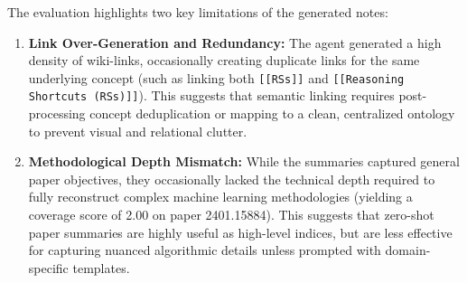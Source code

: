 \documentclass[runningheads]{llncs}
\begin{document}
The evaluation highlights two key limitations of the generated notes:
\begin{enumerate}
    \item \textbf{Link Over-Generation and Redundancy:} The agent generated a high density of wiki-links, occasionally creating duplicate links for the same underlying concept (such as linking both \texttt{[[RSs]]} and \texttt{[[Reasoning Shortcuts (RSs)]]}). This suggests that semantic linking requires post-processing concept deduplication or mapping to a clean, centralized ontology to prevent visual and relational clutter.
    \item \textbf{Methodological Depth Mismatch:} While the summaries captured general paper objectives, they occasionally lacked the technical depth required to fully reconstruct complex machine learning methodologies (yielding a coverage score of 2.00 on paper 2401.15884). This suggests that zero-shot paper summaries are highly useful as high-level indices, but are less effective for capturing nuanced algorithmic details unless prompted with domain-specific templates.
\end{enumerate}
\end{document}
